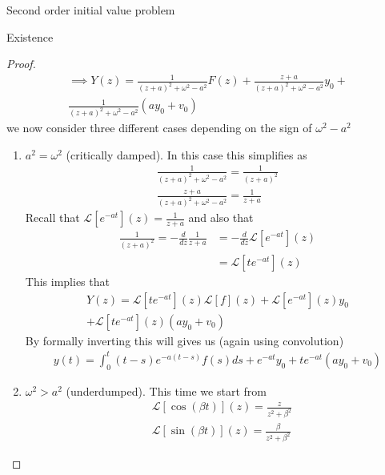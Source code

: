 \begin{parag}{Second order initial value problem}
\begin{subparag}{Existence}
\begin{proof}
\begin{align*}
					\implies Y\left(z\right) = \frac{1}{\left(z + a\right)^2 + \omega^2 - a^2}F\left(z\right) + \frac{z + a}{\left(z + a\right)^2 + \omega^2 - a^2}y_0 +\\ \frac{1}{\left(z + a\right)^2 + \omega^2 - a^2}\left(ay_0 + v_0\right)
				\end{align*}
				we now consider three different cases depending on the sign of $\omega^2 - a^2$
				\begin{enumerate}
				    \item $a^2 =  \omega^2$ (critically damped). In this case this simplifies as 
						\begin{align*} 
							\frac{1}{\left(z + a\right)^2 + \omega^2 - a^2} = \frac{1}{\left(z +a\right)^2}\\
							\frac{z + a}{\left(z + a\right)^2 + \omega^2 - a^2} = \frac{1}{z + a}
						\end{align*}
						Recall that $\mathcal{L}\left[e^{-at}\right]\left(z\right) = \frac{1}{z + a}$ and also that
						\begin{align*} 
							\frac{1}{\left(z + a\right)^2} = - \frac{d}{dz} \frac{1}{z + a} &=  -\frac{d}{dz}  \mathcal{L}\left[e^{-at}\right]\left(z\right) \\
							&= \mathcal{L}\left[te^{-at}\right]\left(z\right)
						\end{align*}
						This implies that 
						\begin{align*} 
							Y\left(z\right) = \mathcal{L}\left[te^{-at}\right]\left(z\right)\mathcal{L}\left[f\right]\left(z\right) + \mathcal{L}\left[e^{-at}\right]\left(z\right)y_0 \\ + \mathcal{L}\left[te^{-at}\right]\left(z\right)\left(ay_0 + v_0\right)
						\end{align*}
						By formally inverting this will gives us (again using convolution)
						\begin{align*} 
							y\left(t\right) = \int_0^{t}\left(t-s\right)e^{-a\left(t-s\right)}f\left(s\right)ds + e^{-at}y_0 + te^{-at}\left(ay_0 + v_0\right)
						\end{align*}
						\item $\omega^2 > a^2$ (underdumped). This time we start from 
							\begin{align*} 
								&\mathcal{L}\left[\cos\left(\beta t\right)\right]\left(z\right) = \frac{z}{z^2 + \beta^2} \\
								&\mathcal{L}\left[\sin\left(\beta t\right)\right]\left(z\right) = \frac{\beta}{z^2 + \beta^2}
							\end{align*}

\end{enumerate}
\end{proof}
\end{subparag}
\end{parag}
